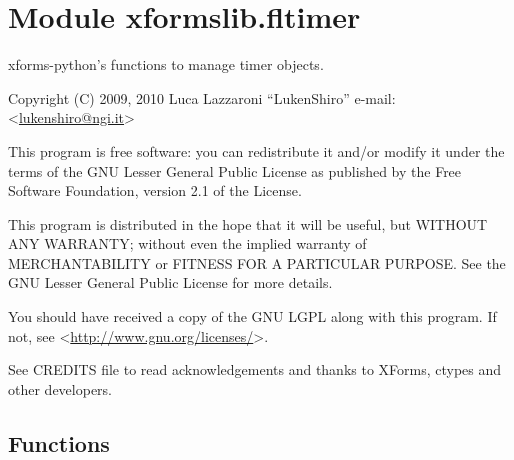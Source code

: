 %
%
%


\section{Module xformslib.fltimer}

    \label{xformslib:fltimer}

xforms-python's functions to manage timer objects.

Copyright (C) 2009, 2010  Luca Lazzaroni ``LukenShiro''
e-mail: <\href{mailto:lukenshiro@ngi.it}{lukenshiro@ngi.it}>

This program is free software: you can redistribute it and/or modify
it under the terms of the GNU Lesser General Public License as
published by the Free Software Foundation, version 2.1 of the License.

This program is distributed in the hope that it will be useful,
but WITHOUT ANY WARRANTY; without even the implied warranty of
MERCHANTABILITY or FITNESS FOR A PARTICULAR PURPOSE. See the
GNU Lesser General Public License for more details.

You should have received a copy of the GNU LGPL along with this
program. If not, see <\href{http://www.gnu.org/licenses/}{http://www.gnu.org/licenses/}>.

See CREDITS file to read acknowledgements and thanks to XForms,
ctypes and other developers.


  \subsection{Functions}

    \label{xformslib:fltimer:fl_add_timer}

